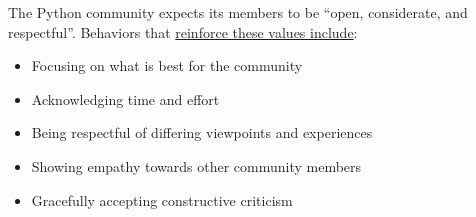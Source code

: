 \begin{kaobox}[frametitle=Culture and values: Python]

The Python community expects its members to be ``open, considerate, and respectful''.  Behaviors that \href{https://www.python.org/psf/conduct/}{reinforce these values include}:

\begin{itemize}

\item Focusing on what is best for the community

\item Acknowledging time and effort

\item Being respectful of differing viewpoints and experiences

\item Showing empathy towards other community members

\item Gracefully accepting constructive criticism

\end{itemize}

\end{kaobox}

